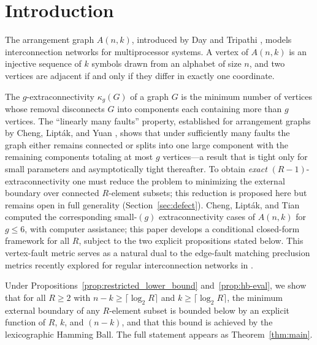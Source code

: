 \section{Introduction}

The arrangement graph $A(n,k)$, introduced by Day and Tripathi
\cite{day1992arrangement}, models interconnection networks for multiprocessor
systems. A vertex of $A(n,k)$ is an injective sequence of $k$ symbols drawn from
an alphabet of size $n$, and two vertices are adjacent if and only if they
differ in exactly one coordinate.

The $g$-extraconnectivity $\kappa_g(G)$ of a graph $G$ is the minimum number of
vertices whose removal disconnects $G$ into components each containing more than
$g$ vertices. The ``linearly many faults'' property, established for arrangement
graphs by Cheng, Lipt\'ak, and Yuan \cite{cheng2013linearly}, shows that under
sufficiently many faults the graph either remains connected or splits into one
large component with the remaining components totaling at most $g$ vertices---a
result that is tight only for small parameters and asymptotically tight
thereafter. To obtain \emph{exact} $(R{-}1)$-extraconnectivity one must reduce
the problem to minimizing the external boundary over connected $R$-element
subsets; this reduction is proposed here but remains open in full generality
(Section~\ref{sec:defect}). Cheng, Lipt\'ak, and Tian
\cite{cheng2022extraconnectivity} computed the corresponding small-$(g)$
extraconnectivity cases of $A(n,k)$ for $g \le 6$, with computer assistance;
this paper develops a conditional closed-form framework for all $R$, subject to
the two explicit propositions stated below. This vertex-fault metric serves as a
natural dual to the edge-fault matching preclusion metrics recently explored for
regular interconnection networks in \cite{cheng2025higher}.

Under Propositions~\ref{prop:restricted_lower_bound} and~\ref{prop:hb-eval}, we show that for
all $R \ge 2$ with $n - k \ge \lceil \log_2 R \rceil$ and
$k \ge \lceil \log_2 R \rceil$, the minimum external boundary of any
$R$-element subset is bounded below by an explicit function of $R$, $k$, and
$(n-k)$, and that this bound is achieved by the lexicographic Hamming Ball.
The full
statement appears as Theorem~\ref{thm:main}.

